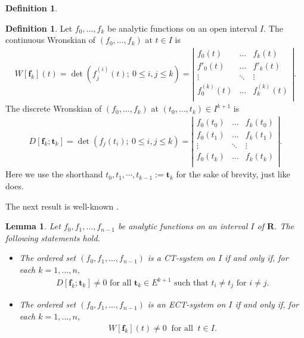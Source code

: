 \documentclass[11pt]{amsart}
\newtheorem{lem}[thm]{Lemma}
\theoremstyle{remark}
\theoremstyle{definition}
\newtheorem{defn}[thm]{Definition}
\begin{document}
\begin{defn}
\begin{defn}
  Let $f_0,\ldots,f_{k}$ be analytic functions on an open interval $I$.
  The continuous Wronskian of $(f_0,\ldots,f_{k})$ at $t\in I$ is
 \begin{align*}
   W[\bm f_k](t)=\det (f^{(i)}_j(t);\ 0\leq i,j\leq k)
   =\left|
  \begin{array}{ccccccc}
  f_0(t)             &\ldots   &f_{k}(t)\\
  f'_0(t)            &\ldots   &f'_{k}(t)   \\
  \vdots            &\ddots   &\vdots                 \\
 f^{(k)}_0(t)       &\ldots   & f^{(k)}_{k}(t)    \\
  \end{array}
  \right|.
 \end{align*}
  The discrete Wronskian of $(f_0,\ldots,f_{k})$ at $(t_0,\ldots,t_{k})\in I^{k+1}$ is
 \begin{align*}
  D[\bm f_k;\bm t_k]=\det (f_j(t_i);\ 0\leq i,j\leq k)
  =\left|
  \begin{array}{ccccccc}
  f_0(t_0)             &\ldots   &f_{k}(t_0)\\
  f_0(t_1)            &\ldots   &f_{k}(t_1)   \\
  \vdots            &\ddots   &\vdots                 \\
 f_0(t_{k})       &\ldots   & f_{k}(t_{k})    \\
  \end{array}
  \right|.
\end{align*}
Here   we use the shorthand $t_0,t_1,\cdots, t_{k-1}:=\bm t_k$  for the sake of brevity, just like  \cite{GGM2016} does.
\end{defn}


The next result is well-known  \cite{KS1966}.
\begin{lem} \label{lem0-1}
Let $ f_0,f_1,\ldots,f_{n-1} $ be analytic functions on an interval $I$ of $\mathbf{R}$. The following statements hold.
\begin{itemize}
  \item [(i)] The ordered set $(f_0,f_1,\ldots,f_{n-1})$ is a CT-system on $I$ if and only if, for each $ k=1,\ldots, n $,
  \begin{align*}
    D[\bm f_{k};\bm t_{k}]\neq0 \text{ for all } \bm t_{k}\in E^{k+1} \text{ such that } t_i\neq t_j \text{ for } i\neq j.
  \end{align*}
  \item [(ii)] The ordered set $(f_0,f_1,\ldots,f_{n-1})$ is an ECT-system on $I$ if and only if, for each $ k=1,\ldots,n $,
  \begin{align*}
    W[\bm f_{k}](t)\neq 0 \ \text{ for all }\  t\in I.
  \end{align*}
\end{itemize}
\end{lem}




\end{defn}
\end{document}
